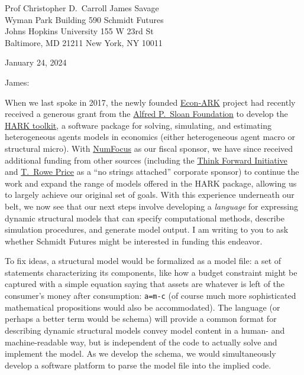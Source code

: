 \documentclass[11pt,pdftex,letterpaper]{article}
\begin{document}
	
\begin{singlespace}
	Prof Christopher D.\ Carroll \hfill James Savage\\
	Wyman Park Building 590 \hfill Schmidt Futures\\
	Johns Hopkins University \hfill 155 W 23rd St\\
	Baltimore, MD 21211 \hfill New York, NY 10011
	
	\vspace{0.2cm}
	
	January 24, 2024
	
\end{singlespace}

\vspace{0.3cm}

James:

When we last spoke in 2017, the newly founded \href{http://www.econ-ark.org}{Econ-ARK} project had recently received a generous grant from the \href{https://sloan.org}{Alfred P.\ Sloan Foundation} to develop the \href{https://github.com/econ-ark/HARK}{HARK toolkit}, a software package for solving, simulating, and estimating heterogeneous agents models in economics (either heterogeneous agent macro or structural micro). With \href{https://numfocus.org/}{NumFocus} as our fiscal sponsor, we have since received additional funding from other sources (including the \href{https://inomics.com/institution/think-forward-initiative-1258337}{Think Forward Initiative} and \href{https://www.troweprice.com/en}{T.\ Rowe Price} as a ``no strings attached'' corporate sponsor) to continue the work and expand the range of models offered in the HARK package, allowing us to largely achieve our original set of goals. With this experience underneath our belt, we now see that our next steps involve developing a \textit{language} for expressing dynamic structural models that can specify computational  methods, describe simulation procedures, and generate model output. I am writing to you to ask whether Schmidt Futures might be interested in funding this endeavor.

To fix ideas, a structural model would be formalized as a model file: a set of statements characterizing its components, like how a budget constraint might be captured with a simple equation saying that assets are whatever is left of the consumer's money after consumption: \texttt{a=m-c} (of course much more sophisticated mathematical propositions would also be accommodated).  The language (or perhaps a better term would be schema) will provide a common format for describing dynamic structural models convey model content in a human- and machine-readable way, but is independent of the code to actually solve and implement the model. As we develop the schema, we would simultaneously develop a software platform to parse the model file into the implied code. %
\end{document}
